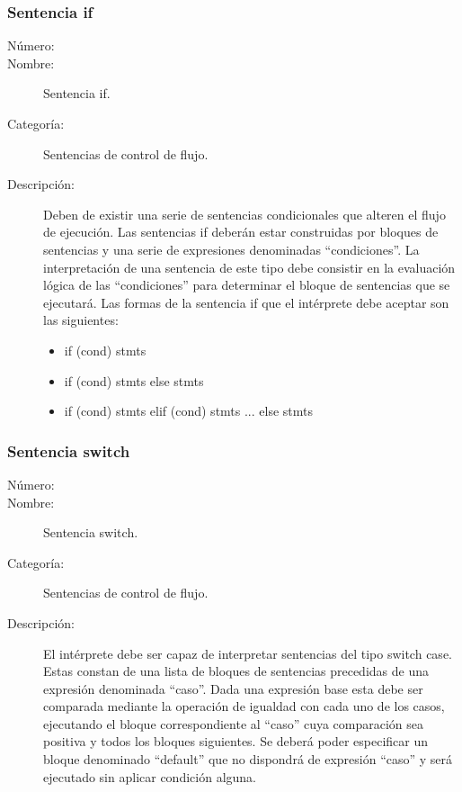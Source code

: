 \subsubsection{Sentencia if} 
\begin{framed}
	\begin{description}
		\item [Número:] \cn
		\item [Nombre:] Sentencia if.
		\item [Categoría:] Sentencias de control de flujo.
		\item [Descripción:] Deben de existir una serie de sentencias condicionales que alteren el flujo de ejecución. Las  
		sentencias if deberán estar construidas por bloques de sentencias y una serie de expresiones denominadas ``condiciones''.
		La interpretación de una sentencia de este tipo debe consistir en la evaluación lógica de las ``condiciones'' para determinar el
		bloque de sentencias que se ejecutará. Las formas de la sentencia if que el intérprete debe aceptar son las siguientes:
		\begin{itemize}
			\item if (cond) stmts
			\item if (cond) stmts else stmts
			\item if (cond) stmts elif (cond) stmts ... else stmts
		\end{itemize}
	\end {description}
\end{framed}

\subsubsection{Sentencia switch}
\begin{framed}
	\begin{description}
		\item [Número:] \cn
		\item [Nombre:] Sentencia switch.
		\item [Categoría:] Sentencias de control de flujo.
		\item [Descripción:] El intérprete debe ser capaz de interpretar sentencias del tipo switch case. Estas
		constan de una lista de bloques de sentencias precedidas de una expresión denominada ``caso''. Dada una expresión base
		esta debe ser comparada mediante la operación de igualdad con cada uno de los casos, ejecutando el bloque correspondiente al ``caso''
		cuya comparación sea positiva y todos los bloques siguientes. Se deberá poder especificar un bloque denominado ``default''
		que no dispondrá de expresión ``caso'' y será ejecutado sin aplicar condición alguna.
	\end {description}
\end{framed}


